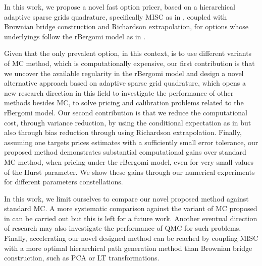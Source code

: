 In this work,  we propose a novel fast option pricer,  based on a  hierarchical adaptive sparse grids quadrature, specifically  MISC as in  \cite{haji2016multi}, coupled with Brownian bridge construction and Richardson extrapolation, for options whose underlyings  follow the rBergomi model as in \cite{bayer2016pricing}. 



Given that the only prevalent option, in this context, is to use different variants of MC method, which is computationally expensive, our first contribution  is that we uncover the available regularity in the rBergomi model and  design a novel alternative approach based on  adaptive sparse grid quadrature, which opens a new research direction in this field to investigate the performance of other methods besides MC, to solve pricing and calibration problems related to the rBergomi model. Our second contribution is that we reduce the computational cost, through variance reduction,  by using the conditional expectation as in \cite{mccrickerd2017turbocharging} but also through bias reduction through using Richardson extrapolation. Finally, assuming one targets prices estimates with a sufficiently small error tolerance, our proposed method demonstrates substantial computational gains  over standard MC method, when pricing under the rBergomi model, even for very small values of the Hurst parameter. We show  these gains through our numerical experiments for  different parameters constellations. 

In this work, we limit ourselves to compare our novel proposed method against standard MC. A more systematic comparison against the variant of MC proposed in \cite{mccrickerd2017turbocharging}  can be carried out but this is left for a future work. Another  eventual direction of research may also investigate the performance of QMC for such problems. Finally, accelerating  our novel designed method can be reached  by coupling MISC with a more optimal hierarchical path generation method than Brownian bridge construction, such as PCA or LT transformations.